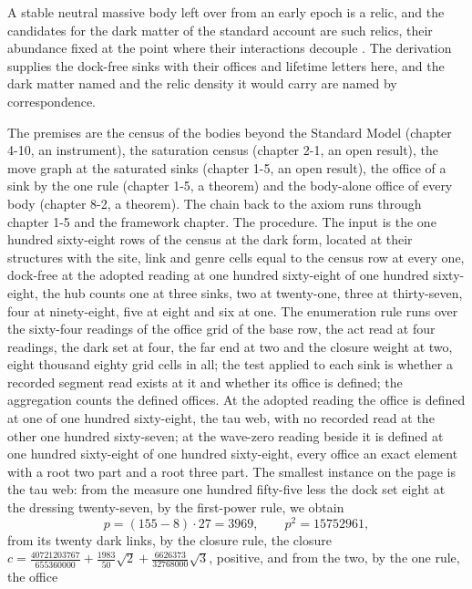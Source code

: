 \begin{chbridge}
A stable neutral massive body left over from an early epoch is a relic, and the candidates for the dark matter of the standard account are such relics, their abundance fixed at the point where their interactions decouple \cite{Zwicky1933,LeeWeinberg1977}. The derivation supplies the dock-free sinks with their offices and lifetime letters here, and the dark matter named and the relic density it would carry are named by correspondence.
\end{chbridge}
\begin{chproof}
The premises are the census of the bodies beyond the Standard Model (chapter 4-10, an instrument), the saturation census (chapter 2-1, an open result), the move graph at the saturated sinks (chapter 1-5, an open result), the office of a sink by the one rule (chapter 1-5, a theorem) and the body-alone office of every body (chapter 8-2, a theorem). The chain back to the axiom runs through chapter 1-5 and the framework chapter. The procedure. The input is the one hundred sixty-eight rows of the census at the dark form, located at their structures with the site, link and genre cells equal to the census row at every one, dock-free at the adopted reading at one hundred sixty-eight of one hundred sixty-eight, the hub counts one at three sinks, two at twenty-one, three at thirty-seven, four at ninety-eight, five at eight and six at one. The enumeration rule runs over the sixty-four readings of the office grid of the base row, the act read at four readings, the dark set at four, the far end at two and the closure weight at two, eight thousand eighty grid cells in all; the test applied to each sink is whether a recorded segment read exists at it and whether its office is defined; the aggregation counts the defined offices. At the adopted reading the office is defined at one of one hundred sixty-eight, the tau web, with no recorded read at the other one hundred sixty-seven; at the wave-zero reading beside it is defined at one hundred sixty-eight of one hundred sixty-eight, every office an exact element with a root two part and a root three part. The smallest instance on the page is the tau web: from the measure one hundred fifty-five less the dock set eight at the dressing twenty-seven, by the first-power rule, we obtain
\begin{equation}
p = (155 - 8)\cdot 27 = 3969 , \qquad p^{2} = 15752961 ,
\end{equation}
from its twenty dark links, by the closure rule, the closure $c = \tfrac{40721203767}{655360000} + \tfrac{1983}{50}\sqrt{2} + \tfrac{6626373}{32768000}\sqrt{3}$, positive, and from the two, by the one rule, the office

\end{chproof}
